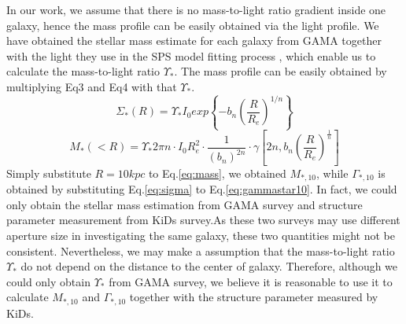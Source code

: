 \documentclass[fleqn,usenatbib]{mnras}
\begin{document}
\par In our work, we assume that there is no mass-to-light ratio gradient inside one galaxy, hence the mass profile can be easily obtained via the light profile. We have obtained the stellar mass estimate for each galaxy from GAMA together with the light they use in the SPS model fitting process \citep{GAMAmain}, which enable us to calculate the mass-to-light ratio $\Upsilon_*$. The mass profile can be easily obtained by multiplying Eq3 and Eq4 with that $\Upsilon_*$.
\begin{equation}
    \label{eq:sigma}
    \Sigma_*(R) = \Upsilon_* I_0 exp\left\{-b_n\left(\frac{R}{R_e}\right)^{1/n}\right\} 
\end{equation}
\begin{equation}
    \label{eq:mass}
    M_*(<R) = \Upsilon_* 2\pi n\cdot I_0R_e^2 \cdot \frac{1}{\left(b_n\right)^{2n}}\cdot \gamma\left[2n,b_n \left(\frac{R}{R_e}\right)^{\frac{1}{n}}\right]
\end{equation}
Simply substitute $R = 10kpc$ to Eq.\ref{eq:mass}, we obtained $M_{*,10}$, while $\Gamma_{*,10}$ is obtained by substituting Eq.\ref{eq:sigma} to Eq.\ref{eq:gammastar10}.
In fact, we could only obtain the stellar mass estimation from GAMA survey and structure parameter measurement from KiDs survey.As these two surveys may use different aperture size in investigating the same galaxy, these two quantities might not be consistent. Nevertheless, we may make a assumption that the mass-to-light ratio $\Upsilon_*$ do not depend on the distance to the center of galaxy. Therefore, although we could only obtain $\Upsilon_*$ from GAMA survey, we believe it is reasonable to use it to calculate $M_{*,10}$ and $\Gamma_{*,10}$ together with the structure parameter measured by KiDs. 
\end{document}

